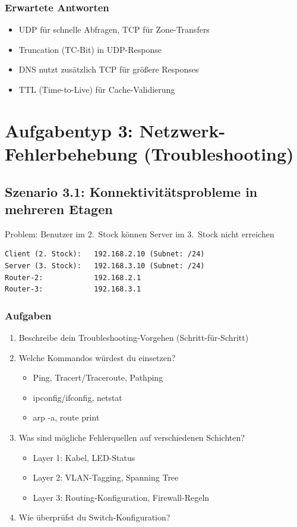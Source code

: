 \documentclass[12pt,a4paper,german]{report}
\begin{document}
\subsection{Erwartete Antworten}
\begin{itemize}
    \item UDP für schnelle Abfragen, TCP für Zone-Transfers
    \item Truncation (TC-Bit) in UDP-Response
    \item DNS nutzt zusätzlich TCP für größere Responses
    \item TTL (Time-to-Live) für Cache-Validierung
\end{itemize}

\chapter{Aufgabentyp 3: Netzwerk-Fehlerbehebung (Troubleshooting)}

\section{Szenario 3.1: Konnektivitätsprobleme in mehreren Etagen}

Problem: Benutzer im 2.\ Stock können Server im 3.\ Stock nicht erreichen

\begin{lstlisting}
Client (2. Stock):   192.168.2.10 (Subnet: /24)
Server (3. Stock):   192.168.3.10 (Subnet: /24)
Router-2:            192.168.2.1
Router-3:            192.168.3.1
\end{lstlisting}

\subsection{Aufgaben}
\begin{enumerate}
    \item Beschreibe dein Troubleshooting-Vorgehen (Schritt-für-Schritt)
    \item Welche Kommandos würdest du einsetzen?
    \begin{itemize}
        \item Ping, Tracert/Traceroute, Pathping
        \item ipconfig/ifconfig, netstat
        \item arp -a, route print
    \end{itemize}
    \item Was sind mögliche Fehlerquellen auf verschiedenen Schichten?
    \begin{itemize}
        \item Layer 1: Kabel, LED-Status
        \item Layer 2: VLAN-Tagging, Spanning Tree
        \item Layer 3: Routing-Konfiguration, Firewall-Regeln
    \end{itemize}
    \item Wie überprüfst du Switch-Konfiguration?
\end{enumerate}
\end{document}
